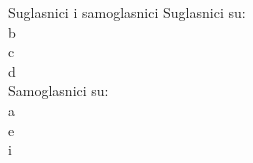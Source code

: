 \documentclass{beamer}
\date{}
\begin{document}
\begin{frame}{Suglasnici i samoglasnici}
	\onslide
	Suglasnici su: \\
	\onslide<1,2,3>b \\
	\onslide<2,3>c \\
	\onslide<3>d\\
	\onslide
	Samoglasnici su: \\
	\onslide<1-3>a \\
	\onslide<2-3>e \\
	\onslide<3>i
\end{frame}
\end{document}
